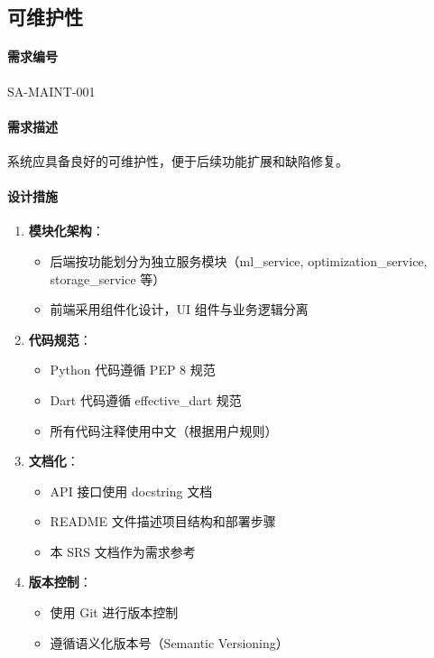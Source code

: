 \subsection{可维护性}

\paragraph{需求编号} SA-MAINT-001

\paragraph{需求描述} 系统应具备良好的可维护性，便于后续功能扩展和缺陷修复。

\paragraph{设计措施}

\begin{enumerate}
    \item \textbf{模块化架构}：
          \begin{itemize}
              \item 后端按功能划分为独立服务模块（ml\_service, optimization\_service, storage\_service 等）
              \item 前端采用组件化设计，UI 组件与业务逻辑分离
          \end{itemize}

    \item \textbf{代码规范}：
          \begin{itemize}
              \item Python 代码遵循 PEP 8 规范
              \item Dart 代码遵循 effective\_dart 规范
              \item 所有代码注释使用中文（根据用户规则）
          \end{itemize}

    \item \textbf{文档化}：
          \begin{itemize}
              \item API 接口使用 docstring 文档
              \item README 文件描述项目结构和部署步骤
              \item 本 SRS 文档作为需求参考
          \end{itemize}

    \item \textbf{版本控制}：
          \begin{itemize}
              \item 使用 Git 进行版本控制
              \item 遵循语义化版本号（Semantic Versioning）
          \end{itemize}
\end{enumerate}

